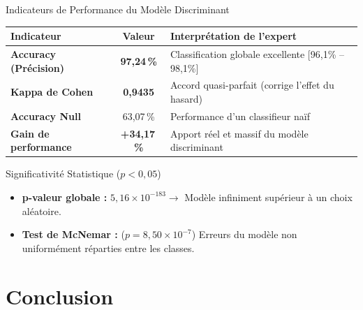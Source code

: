 \documentclass[aspectratio=169, 10pt]{beamer}
\begin{document}
\begin{frame}{Indicateurs de Performance du Modèle Discriminant}
	\begin{center}
		\small
		\renewcommand{\arraystretch}{1.2}
		\begin{tabular}{l|c|l}
			\toprule
			\textbf{Indicateur} & \textbf{Valeur} & \textbf{Interprétation de l'expert} \\
			\midrule
			\textbf{Accuracy (Précision)} & \textbf{97,24\,\%} & Classification globale excellente [96,1\% -- 98,1\%] \\
			\rowcolor{gray!5}
			\textbf{Kappa de Cohen} & \textbf{0,9435} & Accord quasi-parfait (corrige l'effet du hasard) \\
			\textbf{Accuracy Null} & 63,07\,\% & Performance d'un classifieur naïf \\
			\rowcolor{gray!5}
			\textbf{Gain de performance} & \alert{\textbf{+34,17\,\%}} & Apport réel et massif du modèle discriminant \\
			\bottomrule
		\end{tabular}
	\end{center}
	
	\vfill
	
	\begin{block}{Significativité Statistique ($p < 0,05$)}
		\begin{itemize}
			\small
			\item \textbf{p-valeur globale :} $5,16 \times 10^{-183} \rightarrow$ Modèle infiniment supérieur à un choix aléatoire.
			\item \textbf{Test de McNemar :} ($p = 8,50 \times 10^{-7}$) Erreurs du modèle non uniformément réparties entre les classes.
		\end{itemize}
	\end{block}
\end{frame}

\section{Conclusion}
\end{document}
